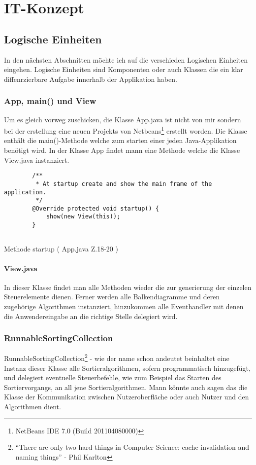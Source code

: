 \chapter{IT-Konzept}

\section{Logische Einheiten}

In den nächsten Abschnitten möchte ich auf die verschieden Logischen Einheiten eingehen. Logische Einheiten
sind Komponenten oder auch Klassen die ein klar diffenrzierbare Aufgabe innerhalb der Applikation haben.

\subsection{App, main() und View}
Um es gleich vorweg zuschicken, die Klasse App.java ist nicht von mir sondern bei der erstellung eine neuen
Projekts von Netbeans\footnote{NetBeans IDE 7.0 (Build 201104080000)} erstellt worden.
Die Klasse enthält die main()-Methode welche zum starten einer jeden Java-Applikation benötigt wird.
In der Klasse App findet mann eine Methode welche die Klasse View.java instanziert.

\begin{listing}[H]
    \begin{verbatim}
        /**
         * At startup create and show the main frame of the application.
         */
        @Override protected void startup() {
            show(new View(this));
        }
    
    \end{verbatim}
    \caption{Methode startup ( App.java Z.18-20 )}
    \label{code:app:startup}
\end{listing}

\subsubsection{View.java}
In dieser Klasse findet man alle Methoden wieder die zur generierung der einzelen Steuerelemente dienen.
Ferner werden alle Balkendiagramme und deren zugehörige Algorithmen instanziert, hinzukommen alle Eventhandler
mit denen die Anwendereingabe an die richtige Stelle delegiert wird.

\subsection{RunnableSortingCollection}
RunnableSortingCollection\footnote{"`There are only two hard things in Computer Science: cache invalidation and naming things"' - Phil Karlton} 
- wie der name schon andeutet beinhaltet eine Instanz dieser Klasse alle Sortieralgorithmen, sofern programmatisch hinzugefügt, und delegiert
eventuelle Steuerbefehle, wie zum Beispiel das Starten des Sortiervorgangs, an all jene Sortieralgorithmen. Mann könnte auch sagen das die Klasse der 
Kommunikation zwischen Nutzeroberfläche oder auch Nutzer und den Algorithmen dient.

